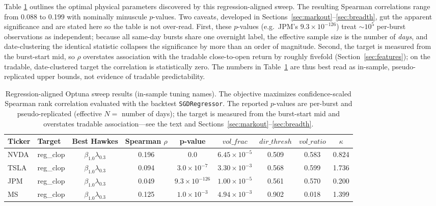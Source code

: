 \documentclass[11pt]{article}
\begin{document}
Table \ref{tab:optuna_regression} outlines the optimal physical parameters discovered by this regression-aligned sweep. The resulting Spearman correlations range from 0.088 to 0.199 with nominally minuscule $p$-values. Two caveats, developed in Sections~\ref{sec:markout}--\ref{sec:breadth}, gut the apparent significance and are stated here so the table is not over-read. First, these $p$-values (e.g.\ JPM's $9.3\times10^{-126}$) treat $\sim$$10^5$ per-burst observations as independent; because all same-day bursts share one overnight label, the effective sample size is the number of \emph{days}, and date-clustering the identical statistic collapses the significance by more than an order of magnitude. Second, the target is measured from the burst-start mid, so $\rho$ overstates association with the tradable close-to-open return by roughly fivefold (Section~\ref{sec:features}); on the tradable, date-clustered target the correlation is statistically zero. The numbers in Table~\ref{tab:optuna_regression} are thus best read as in-sample, pseudo-replicated upper bounds, not evidence of tradable predictability.

\begin{table}[htbp]
\centering
\begin{tabular}{llccccccc}
\toprule
\textbf{Ticker} & \textbf{Target} & \textbf{Best Hawkes} & \textbf{Spearman $\rho$} & \textbf{p-value} & \textbf{$vol\_frac$} & \textbf{$dir\_thresh$} & \textbf{$vol\_ratio$} & \textbf{$\kappa$} \\
\midrule
NVDA & reg\_clop & $\beta_{1.0}\lambda_{0.3}$ & 0.196 & 0.0 & $6.45 \times 10^{-5}$ & 0.509 & 0.583 & 0.824 \\
TSLA & reg\_clop & $\beta_{1.0}\lambda_{0.3}$ & 0.094 & $3.0 \times 10^{-7}$ & $3.30 \times 10^{-3}$ & 0.568 & 0.599 & 1.736 \\
JPM & reg\_clop & $\beta_{1.0}\lambda_{0.3}$ & 0.049 & $9.3 \times 10^{-126}$ & $1.00 \times 10^{-5}$ & 0.561 & 0.570 & 0.200 \\
MS & reg\_clop & $\beta_{1.0}\lambda_{0.3}$ & 0.125 & $1.0 \times 10^{-3}$ & $4.94 \times 10^{-3}$ & 0.902 & 0.018 & 1.399 \\
\bottomrule
\end{tabular}
\caption{Regression-aligned Optuna sweep results (in-sample tuning names). The objective maximizes confidence-scaled Spearman rank correlation evaluated with the backtest \texttt{SGDRegressor}. The reported $p$-values are per-burst and pseudo-replicated (effective $N=$ number of days); the target is measured from the burst-start mid and overstates tradable association---see the text and Sections~\ref{sec:markout}--\ref{sec:breadth}.}
\label{tab:optuna_regression}
\end{table}
\end{document}
